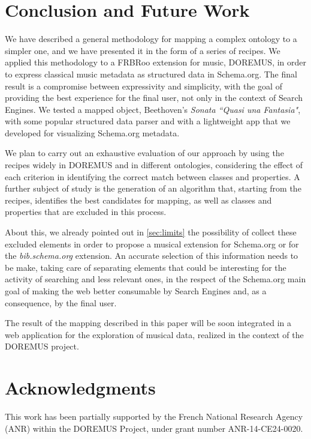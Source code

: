 \documentclass{llncs}
\begin{document}
\section{Conclusion and Future Work}
\label{sec:conclusion}

We have described a general methodology for mapping a complex ontology to a simpler one, and we have presented it in the form of a series of recipes. We applied this methodology to a FRBRoo extension for music, DOREMUS, in order to express classical music metadata as structured data in Schema.org. The final result is a compromise between expressivity and simplicity, with the goal of providing the best experience for the final user, not only in the context of Search Engines. We tested a mapped object, Beethoven's \textit{Sonata ``Quasi una Fantasia"}, with some popular structured data parser and with a lightweight app that we developed for visualizing Schema.org metadata.

We plan to carry out an exhaustive evaluation of our approach by using the recipes widely in DOREMUS and in different ontologies, considering the effect of each criterion in identifying the correct match between classes and properties. A further subject of study is the generation of an algorithm that, starting from the recipes, identifies the best candidates for mapping, as well as classes and properties that are excluded in this process.

About this, we already pointed out in \ref{sec:limits} the possibility of collect these excluded elements in order to propose a musical extension for Schema.org or for the \textit{bib.schema.org} extension. An accurate selection of this information needs to be make, taking care of separating elements that could be interesting for the activity of searching and less relevant ones, in the respect of the Schema.org main goal of making the web better consumable by Search Engines and, as a consequence, by the final user.

The result of the mapping described in this paper will be soon integrated in a web application for the exploration of musical data, realized in the context of the DOREMUS project.

\section*{Acknowledgments}
This work has been partially supported by the French National Research Agency (ANR) within the DOREMUS Project, under grant number ANR-14-CE24-0020.




\newpage


\end{document}

